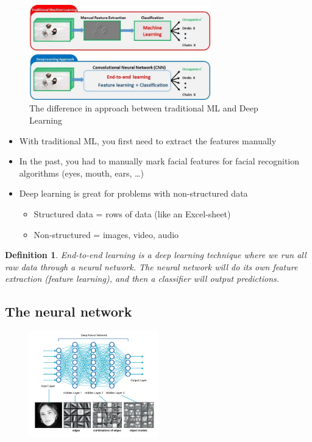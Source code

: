 \documentclass{article}
\newtheorem{theorem}{Definition}[section]
\begin{document}
\begin{figure}[H]
    \centering
    \includegraphics[width=0.7\textwidth]{deep-learning-approach.png}
    \caption{The difference in approach between traditional ML and Deep Learning}
\end{figure}

\begin{itemize}
    \item With traditional ML, you first need to extract the features manually 
    \item In the past, you had to manually mark facial features for facial recognition algorithms (eyes, mouth, ears, \dots)
    \item Deep learning is great for problems with non-structured data
    \begin{itemize}
        \item Structured data = rows of data (like an Excel-sheet)
        \item Non-structured = images, video, audio
    \end{itemize}
\end{itemize}

\begin{theorem}
    End-to-end learning is a deep learning technique where we run all raw data through a neural network.
    The neural network will do its own feature extraction (feature learning), and then a classifier will output predictions.
\end{theorem}


\subsection{The neural network}

\begin{figure}[H]
    \centering
    \includegraphics[width=0.5\textwidth]{neuraal-netwerk.png}
\end{figure}
\end{document}
